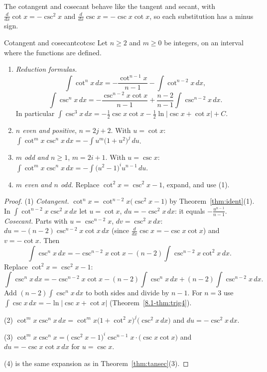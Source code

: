 \documentclass[11pt]{article}
\begin{document}
The cotangent and cosecant behave like the tangent and secant, with $\frac{d}{dx}\cot x=-\csc^2x$ and $\frac{d}{dx}\csc x=-\csc x\cot x$, so each substitution has a minus sign.

\begin{thm}{Cotangent and cosecant}{cotcsc}
Let $n\ge2$ and $m\ge0$ be integers, on an interval where the functions are defined.
\begin{enumerate}[label=(\arabic*)]
  \item \emph{Reduction formulas.}
  \[\int\cot^nx\,dx=-\frac{\cot^{n-1}x}{n-1}-\int\cot^{n-2}x\,dx,\]
  \[\int\csc^nx\,dx=-\frac{\csc^{n-2}x\cot x}{n-1}+\frac{n-2}{n-1}\int\csc^{n-2}x\,dx .\]
  In particular $\displaystyle\int\csc^3x\,dx=-\frac12\csc x\cot x-\frac12\ln\lvert\csc x+\cot x\rvert+C$.
  \item \emph{$n$ even and positive}, $n=2j+2$. With $u=\cot x$: $\displaystyle\int\cot^mx\csc^nx\,dx=-\int u^m\big(1+u^2\big)^j\,du$.
  \item \emph{$m$ odd and $n\ge1$}, $m=2i+1$. With $u=\csc x$: $\displaystyle\int\cot^mx\csc^nx\,dx=-\int\big(u^2-1\big)^iu^{n-1}\,du$.
  \item \emph{$m$ even and $n$ odd.} Replace $\cot^2x=\csc^2x-1$, expand, and use (1).
\end{enumerate}
\end{thm}
\begin{proof}
(1) \emph{Cotangent.} $\cot^nx=\cot^{n-2}x\big(\csc^2x-1\big)$ by Theorem~\ref{thm:ident}(1). In $\int\cot^{n-2}x\csc^2x\,dx$ let $u=\cot x$, $du=-\csc^2x\,dx$: it equals $-\frac{u^{n-1}}{n-1}$. \emph{Cosecant.} Parts with $u=\csc^{n-2}x$, $dv=\csc^2x\,dx$: $du=-(n-2)\csc^{n-2}x\cot x\,dx$ (since $\frac{d}{dx}\csc x=-\csc x\cot x$) and $v=-\cot x$. Then
\[\int\csc^nx\,dx=-\csc^{n-2}x\cot x-(n-2)\int\csc^{n-2}x\cot^2x\,dx .\]
Replace $\cot^2x=\csc^2x-1$:
\[\int\csc^nx\,dx=-\csc^{n-2}x\cot x-(n-2)\int\csc^nx\,dx+(n-2)\int\csc^{n-2}x\,dx .\]
Add $(n-2)\int\csc^nx\,dx$ to both sides and divide by $n-1$. For $n=3$ use $\int\csc x\,dx=-\ln\lvert\csc x+\cot x\rvert$ (Theorem~\ref{8.1-thm:trig4}).

(2) $\cot^mx\csc^nx\,dx=\cot^mx\big(1+\cot^2x\big)^j\big(\csc^2x\,dx\big)$ and $du=-\csc^2x\,dx$.

(3) $\cot^mx\csc^nx=\big(\csc^2x-1\big)^i\csc^{n-1}x\cdot\big(\csc x\cot x\big)$ and $du=-\csc x\cot x\,dx$ for $u=\csc x$.

(4) is the same expansion as in Theorem~\ref{thm:tansec}(3).
\end{proof}
\end{document}
